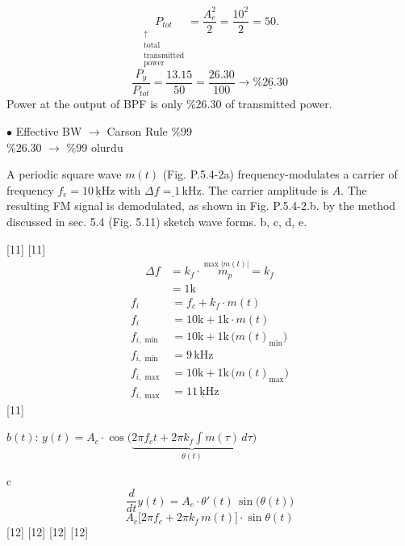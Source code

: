 \documentclass[11pt,a4paper]{article}
\begin{document}
\[ \underset{\substack{\uparrow\\ \text{total}\\ \text{transmitted}\\ \text{power}}}{P_{tot}}=\frac{A_c^2}{2}=\frac{10^2}{2}=50. \]
\[ \frac{P_y}{P_{tot}}=\frac{13.15}{50}=\frac{26.30}{100}\rightarrow\underline{\%26.30} \]
\noindent Power at the output of BPF is only \%26.30 of transmitted power.

\noindent$\bullet$ Effective BW $\rightarrow$ Carson Rule \quad \%99\\
\%26.30 $\rightarrow$ \%99 olurdu

\begin{ornek}[5.4.2]
A periodic square wave $m(t)$ (Fig. P.5.4-2a) frequency-modulates a carrier of frequency $f_c=\underline{10\,\mathrm{kHz}}$ with $\underline{\Delta f=1\,\mathrm{kHz}}$. The carrier amplitude is $A$. The resulting FM signal is demodulated, as shown in Fig. P.5.4-2.b. by the method discussed in sec. 5.4 (Fig. 5.11) sketch wave forms. b, c, d, e.
\end{ornek}
[11]
[11]
\begin{align*}
\Delta f&=k_f\cdot\overset{\max|m(t)|}{m_p}=k_f\\
&=1\mathrm{k}
\end{align*}
\begin{align*}
f_i&=f_c+k_f\cdot m(t)\\
f_i&=10\mathrm{k}+1\mathrm{k}\cdot m(t)\\
f_{i,\min}&=10\mathrm{k}+1\mathrm{k}\,\big(m(t)_{\min}\big)\\
f_{i,\min}&=9\,\mathrm{kHz}\\
f_{i,\max}&=10\mathrm{k}+1\mathrm{k}\,\big(m(t)_{\max}\big)\\
f_{i,\max}&=\underline{11\,\mathrm{kHz}}
\end{align*}
[11]

\noindent $b(t)$: \quad $y(t)=A_c\cdot\cos\Big(\underbrace{2\pi f_c t+2\pi k_f\int m(\tau)\,d\tau}_{\theta(t)}\Big)$

\noindent\textcircled{c}
\[ \frac{d}{dt}y(t)=A_c\cdot\theta'(t)\,\sin\big(\theta(t)\big) \]
\[ A_c\big[2\pi f_c+2\pi k_f\,m(t)\big]\cdot\sin\theta(t) \]
[12]
[12]
[12]
[12]
\end{document}
